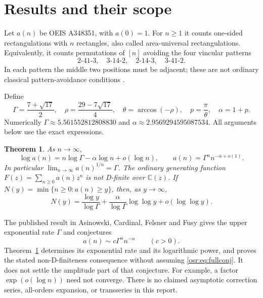 \documentclass[11pt,letterpaper]{article}
\newtheorem{theorem}{Theorem}[section]
\newcommand{\G}{\Gamma}\newcommand{\s}{\sqrt{17}}
\numberwithin{equation}{section}
\begin{document}
\section{Results and their scope}
Let $a(n)$ be OEIS A348351, with $a(0)=1$. For $n\ge1$ it counts one-sided rectangulations with $n$ rectangles, also called area-universal rectangulations. Equivalently, it counts permutations of $[n]$ avoiding the four vincular patterns
\[
2\text{-}41\text{-}3,\quad 3\text{-}14\text{-}2,\quad
2\text{-}14\text{-}3,\quad 3\text{-}41\text{-}2.
\]
In each pattern the middle two positions must be adjacent; these are not ordinary classical pattern-avoidance conditions \cite{oeis,rect}.

Define
\begin{equation}\label{osr:eq:parameters}
 \G=\frac{7+\s}{2},\quad
 \rho=\frac{29-7\s}{4},\quad
 \theta=\arccos(-\rho),\quad p=\frac{\pi}{\theta},\quad \alpha=1+p.
\end{equation}
Numerically $\G\approx5.561552812808830$ and $\alpha\approx2.9569294595087534$. All arguments below use the exact expressions.

\begin{theorem}\label{osr:thm:main}
As $n\to\infty$,
\begin{equation}\label{osr:eq:main}
 \log a(n)=n\log\G-\alpha\log n+o(\log n),
 \qquad a(n)=\G^n n^{-\alpha+o(1)}.
\end{equation}
In particular $\lim_{n\to\infty}a(n)^{1/n}=\G$.
The ordinary generating function $F(z)=\sum_{n\ge0}a(n)z^n$ is not D-finite over $\mathbb C(z)$.
If $N(y)=\min\{n\ge0:a(n)\ge y\}$, then, as $y\to\infty$,
\begin{equation}\label{osr:eq:inverse}
 N(y)=\frac{\log y}{\log\G}
       +\frac{\alpha}{\log\G}\log\log y+o(\log\log y).
\end{equation}
\end{theorem}

The published result in Asinowski, Cardinal, Felsner and Fusy \cite[Proposition 4.23 and the following paragraph, printed pp.~39--40]{rect} gives the upper exponential rate $\G$ and conjectures
\begin{equation}\label{osr:eq:fullconj}
 a(n)\sim c\G^n n^{-\alpha}\qquad(c>0).
\end{equation}
Theorem~\ref{osr:thm:main} determines its exponential rate and its logarithmic power, and proves the stated non-D-finiteness consequence without assuming \eqref{osr:eq:fullconj}. It does not settle the amplitude part of that conjecture. For example, a factor $\exp(o(\log n))$ need not converge. There is no claimed asymptotic correction series, all-orders expansion, or transseries in this report.
\end{document}
